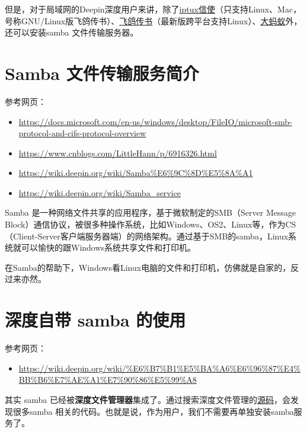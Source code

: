\documentclass[doctor,openright,twoside]{sjtuthesis}
\providecommand{\tightlist}{%
    \setlength{\itemsep}{0pt}\setlength{\parskip}{0pt}}
\theoremstyle{plain}
\theoremstyle{definition}
\theoremstyle{remark}
\theoremstyle{ocrenumbox}
\theoremstyle{plain}
\begin{document}
但是，对于局域网的Deepin深度用户来讲，除了\href{https://github.com/iptux-src/iptux}{iptux信使}（只支持Linux、Mac，号称GNU/Linux版飞鸽传书）、\href{http://www.feige360.com/}{飞鸽传书}（最新版跨平台支持Linux）、\href{https://www.bigant.cn/}{大蚂蚁}外，还可以安装samba 文件传输服务器。

\hypertarget{samba-}{%
\section{Samba 文件传输服务简介}\label{samba-}}

参考网页：

\begin{itemize}
\tightlist
\item
  \url{https://docs.microsoft.com/en-us/windows/desktop/FileIO/microsoft-smb-protocol-and-cifs-protocol-overview}
\item
  \url{https://www.cnblogs.com/LittleHann/p/6916326.html}
\item
  \url{https://wiki.deepin.org/wiki/Samba\%E6\%9C\%8D\%E5\%8A\%A1}
\item
  \url{https://wiki.deepin.org/wiki/Samba_service}
\end{itemize}

Samba 是一种网络文件共享的应用程序，基于微软制定的SMB（Server Message Block）通信协议，被很多种操作系统，比如Windows、OS2、Linux等，作为CS（Client-Server客户端服务器端）的网络架构。通过基于SMB的samba，Linux系统就可以愉快的跟Windows系统共享文件和打印机。

在Samba的帮助下，Windows看Linux电脑的文件和打印机，仿佛就是自家的，反过来亦然。

\hypertarget{samba--1}{%
\section{深度自带 samba 的使用}\label{samba--1}}

参考网页：

\begin{itemize}
\tightlist
\item
  \url{https://wiki.deepin.org/wiki/\%E6\%B7\%B1\%E5\%BA\%A6\%E6\%96\%87\%E4\%BB\%B6\%E7\%AE\%A1\%E7\%90\%86\%E5\%99\%A8}
\end{itemize}

其实 samba 已经被\textbf{深度文件管理器}集成了。通过搜索深度文件管理的\href{https://github.com/linuxdeepin/dde-file-manager/search?q=samba\&unscoped_q=samba}{源码}，会发现很多samba 相关的代码。也就是说，作为用户，我们不需要再单独安装samba服务了。
\end{document}
